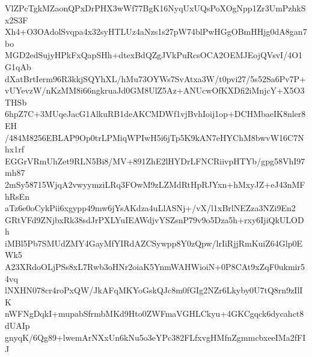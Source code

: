 VlZPcTgkMZaonQPxDrPHX3wWf77BgK16NyqUxUQsPoXOgNpp1Zr3UmPzhkSx2S3F
Xh4+O3OAdolSvqpa4x32syHTLUz4aNzs1s27pW74blPwHGgOBmHHjg0dA8gan7bo
MGD2edSujyHPkFxQapSHh+dtexBdQZgJVkPuRcsOCA2OEMJEojQVsvI/4O1G1qAb
dXatBrtIerm96R3kkjSQYhXL/hMu73OYWs7SvAtxa3W/t0pvi27/5s52Sa6Pv7P+
vUYevzW/nKzMM8i66ngkruaJd0GM8UlZ5Az+ANUcwOfKXDfi2iMnjcY+X5O3THSb
6hpZ7C+3MUqeJacG1AlkuRB1deAKCMDWf1vjBvhIoij1op+DCHMbaeIK8nler8EH
/484M8256EBLAP9Op0trLPMiqWPIwH5i6jTp5K9kAN7eHYChM8bwvW16C7Nhx1rf
EGGrVRmUhZet9RLN5Bi8/MV+891ZhE2lHYDrLFNCRiivpHTYb/gpg58VhI97mh87
2mSy58715WjqA2vwyymziLRq3FOwM9zLZMdRtHpRJYxn+hMxyJZ+eJ43nMFhRsEn
aTz6e0oCykPii6xgypp49mw6jYsAKdza4uLlASNj+/vX/l1xBrlNEZza3NZi9En2
GRtVFd9ZNjbxRk38sdJrPXLYuIEAWdjvYSZsnP79v9o5Dza5h+rxy6IjiQkULODh
iMBl5Pb7SMUdZMY4GayMfYIRdAZCSywpp8Y0zQpw/lrIiRjjRmKuiZ64Glp0EWk5
A23XRdoOLjPSs8xL7Rwb3oHNr2oiaK5YnmWAHWioiN+0P8CAt9xZqF0ukmir54vq
lNXHN078cr4roPxQW/JkAFqMKYoGskQJc8m0fGIg2NZr6Lkyby0U7tQ8rn9zIlIK
nWFNgDqkI+mupabSfrmbMKd9Hto0ZWFmaVGHLCkyu+4GKCgqck6dycahct8dUAIp
gnyqK/6Qg89+lwemArNXxUn6kNu5o3eYPc382FLfxvgHMfnZgmmcbxeeIMa2fFIJ
